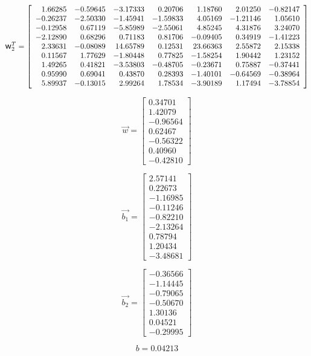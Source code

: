 \documentclass[preprint,12pt,times]{elsarticle}
\newcommand{\w}{\mbox{\large\ensuremath{\mathsf{w}}}}
\begin{document}
\begin{equation*}
\w_2^T=\left[
\begin{array}{rrrrrrrrr}
  1.66285 & -0.59645 & -3.17333 &  0.20706 &  1.18760 &  2.01250 & -0.82147\\
 -0.26237 & -2.50330 & -1.45941 & -1.59833 &  4.05169 & -1.21146 &  1.05610\\
 -0.12958 &  0.67119 & -5.85989 & -2.55061 &  4.85245 &  4.31876 &  3.24070\\
 -2.12890 &  0.68296 &  0.71183 &  0.81706 & -0.09405 &  0.34919 & -1.41223\\
  2.33631 & -0.08089 &  14.65789 &  0.12531 &  23.66363 &  2.55872 &  2.15338\\
  0.11567 &  1.77629 & -1.80448 &  0.77825 & -1.58254 &  1.90442 &  1.23152\\
  1.49265 &  0.41821 & -3.53803 & -0.48705 & -0.23671 &  0.75887 & -0.37441\\
  0.95990 &  0.69041 &  0.43870 &  0.28393 & -1.40101 & -0.64569 & -0.38964\\
  5.89937 & -0.13015 &  2.99264 &  1.78534 & -3.90189 &  1.17494 & -3.78854
\end{array}\right]
\end{equation*}

\begin{equation*}
\overrightarrow{w}=\left[
\begin{array}{r}
  0.34701\\
  1.42079\\
 -0.96564\\
  0.62467\\
 -0.56322\\
  0.40960\\
 -0.42810
\end{array}\right]
\end{equation*}

\begin{equation*}
\overrightarrow{b_1}=\left[
\begin{array}{r}
  2.57141\\
  0.22673\\
 -1.16985\\
 -0.11246\\
 -0.82210\\
 -2.13264\\
  0.78794\\
  1.20434\\
 -3.48681
\end{array}\right]
\end{equation*}

\begin{equation*}
\overrightarrow{b_2}=\left[
\begin{array}{r}
 -0.36566\\
 -1.14445\\
 -0.79065\\
 -0.50670\\
  1.30136\\
  0.04521\\
 -0.29995
\end{array}\right]
\end{equation*}

\begin{equation*}
b=0.04213
\end{equation*}

%
\end{document}
